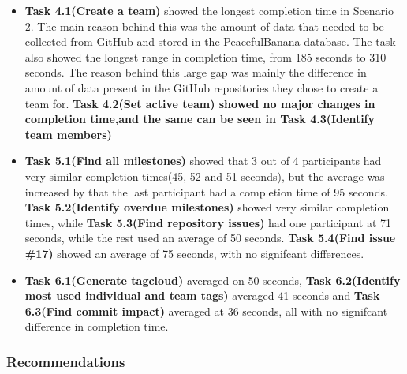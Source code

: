 \begin{itemize}
	\item \textbf{Task 4.1(Create a team)} showed the longest completion time in Scenario 2. The main reason behind this was the amount of data that needed to be collected from GitHub and stored in the PeacefulBanana database. The task also showed the longest range in completion time, from 185 seconds to 310 seconds. The reason behind this large gap was mainly the difference in amount of data present in the GitHub repositories they chose to create a team for. \textbf{Task 4.2(Set active team) showed no major changes in completion time,and the same can be seen in \textbf{Task 4.3(Identify team members)}}
	\item \textbf{Task 5.1(Find all milestones)} showed that 3 out of 4 participants had very similar completion times(45, 52 and 51 seconds), but the average was increased by that the last participant had a completion time of 95 seconds. \textbf{Task 5.2(Identify overdue milestones)} showed very similar completion times, while \textbf{Task 5.3(Find repository issues)} had one participant at 71 seconds, while the rest used an average of 50 seconds. \textbf{Task 5.4(Find issue \#17)} showed an average of 75 seconds, with no signifcant differences. 
	\item \textbf{Task 6.1(Generate tagcloud)} averaged on 50 seconds, \textbf{Task 6.2(Identify most used individual and team tags)} averaged 41 seconds and \textbf{Task 6.3(Find commit impact)} averaged at 36 seconds, all with no signifcant difference in completion time. 
\end{itemize}


\subsubsection{Recommendations}
